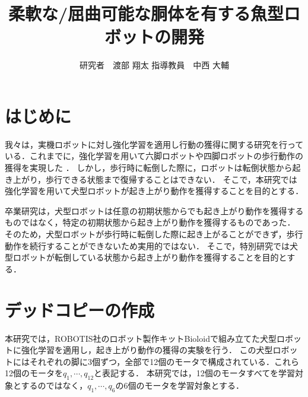 \documentclass{jarticle}
\begin{document}

\title{
柔軟な/屈曲可能な胴体を有する魚型ロボットの開発
}
\author{
研究者　渡部 翔太\;\;\;
指導教員　中西 大輔
}

\maketitle

\thispagestyle{empty}  %

\section{はじめに}

我々は，実機ロボットに対し強化学習を適用し行動の獲得に関する研究を行っている．これまでに，強化学習を用いて六脚ロボットや四脚ロボットの歩行動作の獲得を実現した\cite{Horiuchi2013} ．
しかし，歩行時に転倒した際に，ロボットは転倒状態から起き上がり，歩行できる状態まで復帰することはできない．
そこで，本研究では強化学習を用いて犬型ロボットが起き上がり動作を獲得することを目的とする．

卒業研究は，犬型ロボットは任意の初期状態からでも起き上がり動作を獲得するものではなく，特定の初期状態から起き上がり動作を獲得するものであった．
そのため，犬型ロボットが歩行時に転倒した際に起き上がることができず，歩行動作を続行することができないため実用的ではない．
そこで，特別研究では犬型ロボットが転倒している状態から起き上がり動作を獲得することを目的とする．

\vspace*{-2mm}
\section{デッドコピーの作成}

本研究では，ROBOTIS社のロボット製作キットBioloidで組み立てた犬型ロボットに強化学習を適用し，起き上がり動作の獲得の実験を行う．
この犬型ロボットにはそれぞれの脚に3個ずつ，全部で12個のモータで構成されている．これら12個のモータを$q_1, \cdots, q_{12}$と表記する．
本研究では，12個のモータすべてを学習対象とするのではなく，$q_1, \cdots, q_6$の6個のモータを学習対象とする．
\end{document}
